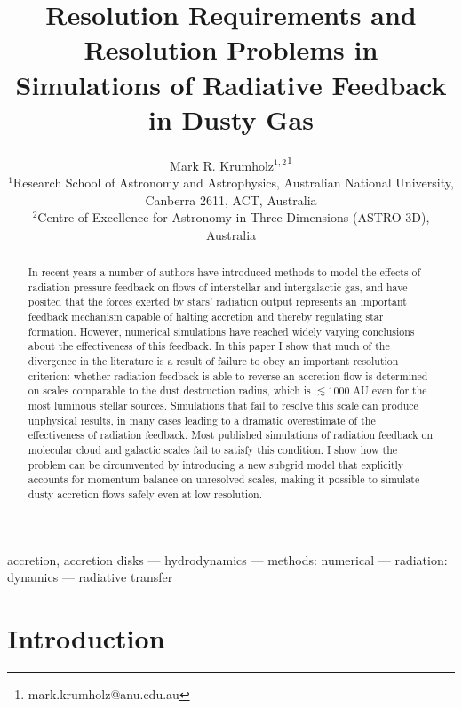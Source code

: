 \documentclass[useAMS,usenatbib]{mn2e}
\title[Simulation of Radiative Feedback]{Resolution Requirements and Resolution Problems in Simulations of Radiative Feedback in Dusty Gas}
\author[Krumholz]{Mark R. Krumholz$^{1,2}$\thanks{mark.krumholz@anu.edu.au}
\\
$^{1}$Research School of Astronomy and Astrophysics, Australian National University, Canberra 2611, ACT, Australia\\
$^{2}$Centre of Excellence for Astronomy in Three Dimensions (ASTRO-3D), Australia
}
\begin{document}
\maketitle
\label{firstpage}
\begin{abstract}
In recent years a number of authors have introduced methods to model the effects of radiation pressure feedback on flows of interstellar and intergalactic gas, and have posited that the forces exerted by stars' radiation output represents an important feedback mechanism capable of halting accretion and thereby regulating star formation. However, numerical simulations have reached widely varying conclusions about the effectiveness of this feedback. In this paper I show that much of the divergence in the literature is a result of failure to obey an important resolution criterion: whether radiation feedback is able to reverse an accretion flow is determined on scales comparable to the dust destruction radius, which is $\lesssim 1000$ AU even for the most luminous stellar sources. Simulations that fail to resolve this scale can produce unphysical results, in many cases leading to a dramatic overestimate of the effectiveness of radiation feedback. Most published simulations of radiation feedback on molecular cloud and galactic scales fail to satisfy this condition. I show how the problem can be circumvented by introducing a new subgrid model that explicitly accounts for momentum balance on unresolved scales, making it possible to simulate dusty accretion flows safely even at low resolution.
\end{abstract}

\begin{keywords}
accretion, accretion disks --- hydrodynamics --- methods: numerical --- radiation: dynamics --- radiative transfer
\end{keywords}


\section{Introduction}
\label{sec:intro}
\end{document}
